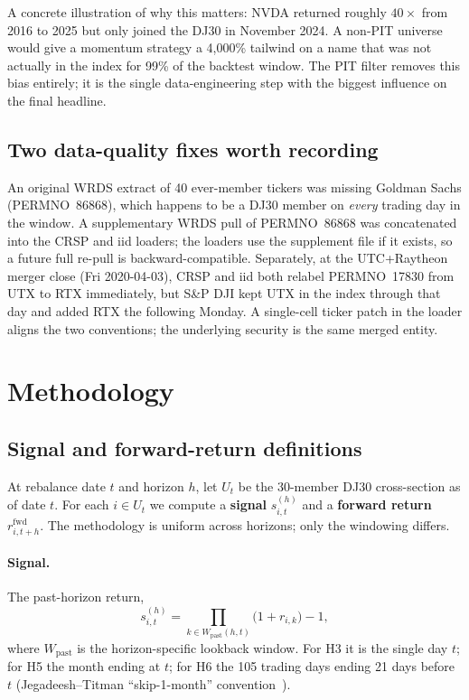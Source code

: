 \documentclass[10pt,conference,compsoc]{IEEEtran}
\begin{document}
A concrete illustration of why this matters: NVDA returned roughly
$40\times$ from 2016 to 2025 but only joined the DJ30 in November
2024. A non-PIT universe would give a momentum strategy a 4{,}000\%
tailwind on a name that was not actually in the index for 99\% of
the backtest window. The PIT filter removes this bias entirely; it
is the single data-engineering step with the biggest influence on
the final headline.

\subsection{Two data-quality fixes worth recording}

An original WRDS extract of 40 ever-member tickers was missing
Goldman Sachs (PERMNO~86868), which happens to be a DJ30 member on
\emph{every} trading day in the window. A supplementary WRDS pull of
PERMNO~86868 was concatenated into the CRSP and iid loaders; the
loaders use the supplement file if it exists, so a future full re-pull
is backward-compatible. Separately, at the UTC+Raytheon merger close
(Fri 2020-04-03), CRSP and iid both relabel PERMNO~17830 from UTX to
RTX immediately, but S\&P DJI kept UTX in the index through that day
and added RTX the following Monday. A single-cell ticker patch in the
loader aligns the two conventions; the underlying security is the same
merged entity.

\section{Methodology}
\label{sec:method}

\subsection{Signal and forward-return definitions}

At rebalance date $t$ and horizon $h$, let $U_t$ be the 30-member DJ30
cross-section as of date $t$. For each $i \in U_t$ we compute a
\textbf{signal} $s_{i,t}^{(h)}$ and a \textbf{forward return}
$r_{i,t+h}^{\text{fwd}}$. The methodology is uniform across horizons;
only the windowing differs.

\paragraph{Signal.} The past-horizon return,
\begin{equation}
  s_{i,t}^{(h)} = \prod_{k \in W_{\text{past}}(h,t)}
                  \bigl(1 + r_{i,k}\bigr) - 1,
  \label{eq:signal}
\end{equation}
where $W_{\text{past}}$ is the horizon-specific lookback window. For
H3 it is the single day $t$; for H5 the month ending at $t$; for H6
the 105 trading days ending 21 days before $t$ (Jegadeesh--Titman
``skip-1-month'' convention~\cite{jt1993}).
\end{document}
